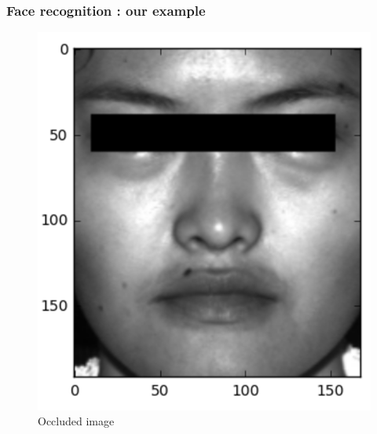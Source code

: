 \documentclass{beamer}
\begin{document}
\begin{frame}
\frametitle{Face recognition : our example}

			\begin{figure}[!ht]
			\begin{center}
			\includegraphics[scale=0.4]{occluded_face.png}
			\end{center}
			\caption{Occluded image}
			\label{fa}
			\end{figure}
\end{frame}

\end{document}
